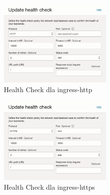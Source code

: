 \begin{multicols}{2}
    \begin{figure}[H]
        \centering
        \includegraphics[width=0.5\textwidth]{img/oci-network-load-balancer-ingress-http-health-check}
        \caption{Health Check dla ingress-http}
        \label{fig:oci-network-load-balancer-ingress-http-health-check}
    \end{figure}
    \begin{figure}[H]
        \centering
        \includegraphics[width=0.5\textwidth]{img/oci-network-load-balancer-ingress-https-health-check}
        \caption{Health Check dla ingress-https}
        \label{fig:oci-network-load-balancer-ingress-https-health-check}
    \end{figure}
\end{multicols}

